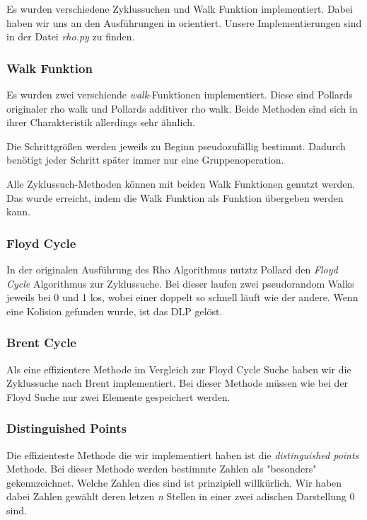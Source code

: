 \documentclass{scrartcl}
\begin{document}
Es wurden verschiedene Zyklussuchen und Walk Funktion
implementiert.
Dabei haben wir uns an den Ausführungen in \cite{Galbraith2012}
orientiert.
Unsere Implementierungen sind in der Datei \emph{rho.py} zu finden.

\subsubsection{Walk Funktion}
\label{sec:walk_funktion}
Es wurden zwei verschiende \emph{walk}-Funktionen implementiert.
Diese sind Pollards originaler rho walk und Pollards additiver rho walk.
Beide Methoden sind sich in ihrer Charakteristik allerdings sehr ähnlich.

Die Schrittgrößen werden jeweils zu Beginn pseudozufällig bestimmt.
Dadurch benötigt jeder Schritt später immer nur eine Gruppenoperation.

Alle Zyklussuch-Methoden können mit beiden Walk Funktionen genutzt werden.
Das wurde erreicht, indem die Walk Funktion als Funktion übergeben werden kann.

\subsubsection{Floyd Cycle}
\label{sec:floyd_cycle}
In der originalen Ausführung des Rho Algorithmus nutztz Pollard
den \emph{Floyd Cycle} Algorithmus zur Zyklussuche.
Bei dieser laufen zwei pseudorandom Walks jeweils bei 0 und 1 los,
wobei einer doppelt so schnell läuft wie der andere.
Wenn eine Kolision gefunden wurde, ist das DLP gelöst.
\cite{Galbraith2012}

\subsubsection{Brent Cycle}
\label{sec:brent_cycle}
Als eine effizientere Methode im Vergleich zur Floyd Cycle Suche
haben wir die Zyklussuche nach Brent \cite{Brent1980} implementiert.
Bei dieser Methode müssen wie bei der Floyd Suche nur zwei Elemente gespeichert werden.
\cite{Galbraith2012}

\subsubsection{Distinguished Points}
\label{sec:distinguished_points}
Die effizienteste Methode die wir implementiert haben ist die
\emph{distinguished points} Methode.
Bei dieser Methode werden bestimmte Zahlen als "besonders" gekennzeichnet.
Welche Zahlen dies sind ist prinzipiell willkürlich.
Wir haben dabei Zahlen gewählt deren letzen \emph{n} Stellen in einer
zwei adischen Darstellung 0 sind.
\end{document}

